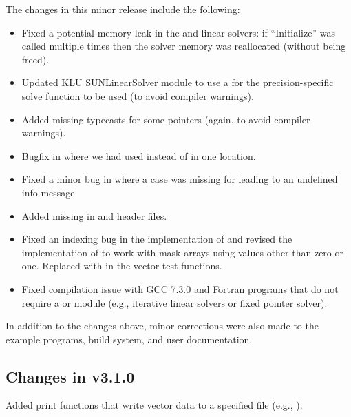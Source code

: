The changes in this minor release include the following:
\begin{itemize}
\item Fixed a potential memory leak in the {\spgmr} and {\spfgmr} linear
  solvers: if ``Initialize'' was called multiple times then the solver
  memory was reallocated (without being freed).
  
\item Updated KLU SUNLinearSolver module to use a  for the
  precision-specific solve function to be used (to avoid compiler 
  warnings).  
  
\item Added missing typecasts for some  pointers (again, to
  avoid compiler warnings). 
  
\item Bugfix in  where we had used 
  instead of  in one location. 
  
\item Fixed a minor bug in  where a case was missing for
   leading to an undefined info message.
  
\item Added missing  in {\nvector} and {\sunmatrix}
  header files.
  
\item Fixed an indexing bug in the {\cuda} {\nvector} implementation of
   and revised the {\raja} {\nvector} implementation of
   to work with mask arrays using values other than zero or
  one. Replaced  with  in the {\raja} vector test functions.
  
\item Fixed compilation issue with GCC 7.3.0 and Fortran programs that do
  not require a {\sunmatrix} or {\sunlinsol} module (e.g., iterative
  linear solvers or fixed pointer solver).
\end{itemize}
In addition to the changes above, minor corrections were also made to the
example programs, build system, and user documentation.

\subsection*{Changes in v3.1.0}

Added {\nvector} print functions that write vector data to a specified
file (e.g., ).

